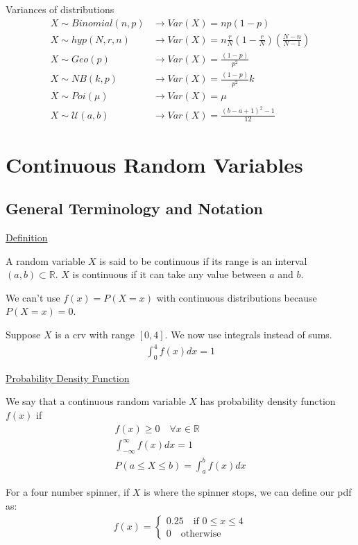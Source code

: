 \documentclass{article}
\begin{document}
Variances of distributions
\begin{align*}
    X \sim Binomial(n,p) &\to Var(X) = np(1-p) \\
    X \sim hyp(N,r,n) &\to Var(X) = n\frac{r}{N}\left(1-\frac{r}{N}\right)\left(\frac{N-n}{N-1}\right) \\
    X \sim Geo(p) &\to Var(X) = \frac{(1-p)}{p^2} \\
    X \sim NB(k,p) &\to Var(X) = \frac{(1-p)}{p^2}k \\
    X \sim Poi(\mu) &\to Var(X) = \mu\\
    X \sim \mathcal{U}(a,b) &\to Var(X) = \frac{(b-a+1)^2-1}{12}
\end{align*}


\section{Continuous Random Variables}

\subsection{General Terminology and Notation}

\underline{Definition}

A random variable $X$ is said to be continuous if its range is an interval $(a,b) \subset \mathbb{R}$. $X$ is continuous if it can take any value between $a$ and $b$. 

We can't use $f(x) = P(X = x)$ with continuous distributions because $P(X=x) = 0$.

Suppose $X$ is a crv with range $[0,4]$. We now use integrals instead of sums.
\begin{align*}
    \int_0^4f(x)dx = 1
\end{align*}

\underline{Probability Density Function}

We say that a continuous random variable $X$ has probability density function $f(x)$ if
\begin{align*}
    f(x) \ge 0 \quad \forall x \in \mathbb{R}\\
    \int_{-\infty}^{\infty}f(x)dx = 1\\
    P(a \le X \le b) = \int_a^bf(x)dx
\end{align*}

For a four number spinner, if $X$ is where the spinner stops, we can define our pdf as:
\begin{align*}
    f(x)=\begin{cases}
        0.25 \quad \text{if } 0 \le x \le 4\\
        0 \quad \text{otherwise}
    \end{cases}
\end{align*}
\end{document}
